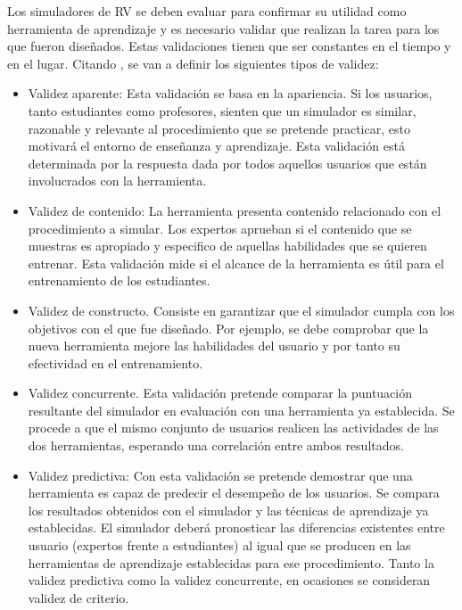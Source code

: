 Los simuladores de \ac{RV} se deben evaluar para confirmar su utilidad como herramienta de aprendizaje y es necesario validar que realizan la tarea para los que fueron diseñados. Estas validaciones tienen que ser constantes en el tiempo y en el lugar. 
Citando \cite{pales2010uso}, se van a definir los siguientes tipos de validez:
\begin{itemize}
    \item Validez aparente:
    Esta validación se basa en la apariencia. Si los usuarios, tanto estudiantes como profesores, sienten que un simulador es similar, razonable y relevante al procedimiento que se pretende practicar, esto motivará el entorno de enseñanza y aprendizaje. Esta validación está determinada por la respuesta dada por todos aquellos usuarios que están involucrados con la herramienta.
    
    \item Validez de contenido: La herramienta presenta contenido relacionado con el procedimiento a simular. Los expertos aprueban si el contenido que se muestras es apropiado y especifico de aquellas habilidades que se quieren entrenar.
    Esta validación mide si el alcance de la herramienta es útil para el entrenamiento de los estudiantes.
    
        \item Validez de constructo.
    Consiste en garantizar que el simulador cumpla con los objetivos con el que fue diseñado. Por ejemplo, se debe comprobar que la nueva herramienta mejore las habilidades del usuario y por tanto su efectividad en el entrenamiento. 
    
    \item Validez concurrente.
    Esta validación pretende comparar la puntuación resultante del simulador en evaluación con una herramienta ya establecida. Se procede a que el mismo conjunto de usuarios realicen las actividades de las dos herramientas, esperando una correlación entre ambos resultados.

    \item Validez predictiva:
    Con esta validación se pretende demostrar que una herramienta es capaz de predecir el desempeño de los usuarios. Se compara los resultados obtenidos con el simulador y las técnicas de aprendizaje ya establecidas. El simulador deberá pronosticar las diferencias existentes entre usuario (expertos frente a estudiantes) al igual que se producen en las herramientas de aprendizaje establecidas para ese procedimiento.  Tanto la validez predictiva como la validez concurrente, en ocasiones se consideran validez de criterio. 
    

\end{itemize}

